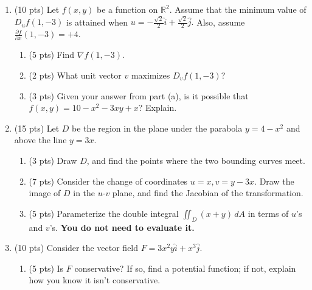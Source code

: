 \documentclass[12 pt]{report}
\begin{document}
\newpage
\begin{enumerate}

\item (10 pts) Let $f(x,y)$ be a function on $\mathbb{R}^2$. Assume that the minimum value of $D_u f(1,-3)$ is attained when $u = -\frac{\sqrt{2}}{2} \widehat{i} + \frac{\sqrt{2}}{2} \widehat{j}.$ Also, assume $\frac{\partial f}{\partial x}(1,-3) = +4$. 

\begin{enumerate} \item (5 pts) Find $\nabla f(1,-3)$. 

\vfill 

\item (2 pts) What unit vector $v$ maximizes $D_v f(1,-3)$?

\vfill 

\item (3 pts) Given your answer from part (a), is it possible that $f(x,y) = 10 - x^2 - 3xy + x$? Explain. 

\vfill 

\end{enumerate} 

\newpage

\item (15 pts) Let $D$ be the region in the plane under the parabola $y = 4-x^2$ and above the line $y = 3x$. 

\begin{enumerate} \item (3 pts) Draw $D$, and find the points where the two bounding curves meet. 

\vfill 

\item (7 pts) Consider the change of coordinates $u = x, v = y - 3x$. Draw the image of $D$ in the $u$-$v$ plane, and find the Jacobian of the transformation. 

\vfill 

\item (5 pts) Parameterize the double integral $\iint_D (x+y) \, dA$ in terms of $u$'s and $v$'s. \textbf{You do not need to evaluate it.}

\vfill 

\end{enumerate}

\newpage

\item (10 pts) Consider the vector field $F = 3x^2 y \widehat{i} + x^3 \widehat{j}$. 

\begin{enumerate} \item (5 pts) Is $F$ conservative? If so, find a potential function; if not, explain how you know it isn't conservative. 


\end{enumerate}
\end{enumerate}
\end{document}
